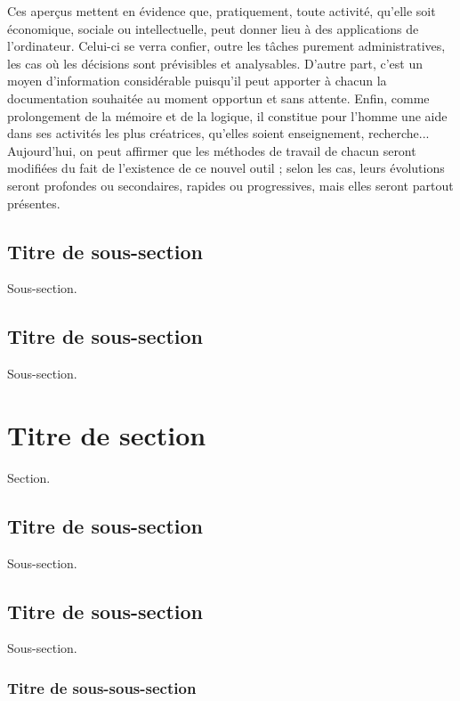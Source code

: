     Ces aper\c{c}us mettent en \'evidence que, pratiquement, toute activit\'e, qu'elle soit \'economique, sociale ou intellectuelle, peut donner lieu \`a des applications de l'ordinateur. Celui-ci se verra confier, outre les t\^aches purement administratives, les cas o\`u les d\'ecisions sont pr\'evisibles et analysables. D'autre part, c'est un moyen d'information consid\'erable puisqu'il peut apporter \`a chacun la documentation souhait\'ee au moment opportun et sans attente. Enfin, comme prolongement de la m\'emoire et de la logique, il constitue pour l'homme une aide dans ses activit\'es les plus cr\'eatrices, qu'elles soient enseignement, recherche... Aujourd'hui, on peut affirmer que les m\'ethodes de travail de chacun seront modifi\'ees du fait de l'existence de ce nouvel outil ; selon les cas, leurs \'evolutions seront profondes ou secondaires, rapides ou progressives, mais elles seront partout pr\'esentes.
        
    \subsection{Titre de sous-section}
    
    Sous-section.
    
    \subsection{Titre de sous-section}

    Sous-section.
        
\section{Titre de section}

    Section.
        
    \subsection{Titre de sous-section}
    
    Sous-section.
    
    \subsection{Titre de sous-section}
    
    Sous-section.
    
    \subsubsection{Titre de sous-sous-section}
    
